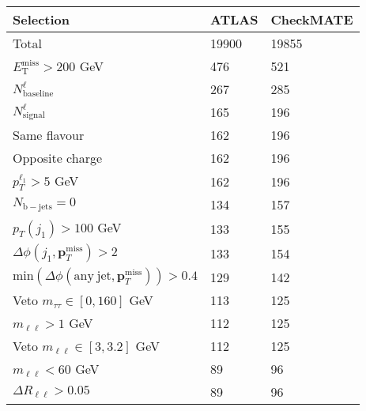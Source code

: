 \documentclass[12pt,fleqn]{article}
\begin{document}
\begin{table}[h!] 
 \renewcommand*{\arraystretch}{1.2}
 \begin{tabular}{l|p{3cm}|p{3cm}} \toprule
  Selection                                                                       & ATLAS    & CheckMATE       \\ \midrule
  Total                                                                           & 19900    & 19855           \\
  $E_\mathrm{T}^\mathrm{miss} > 200$ GeV                                          & 476      & 521   \\
  $N^\ell_\mathrm{baseline}$                                                      & 267      & 285   \\
  $N^\ell_\mathrm{signal}$                                                        & 165      & 196   \\
  Same flavour                                                                    & 162      & 196   \\
  Opposite charge                                                                 & 162      & 196   \\ 
  $p_T^{\ell_1} > 5$ GeV                                                          & 162      & 196    \\ 
  $N_\mathrm{b-jets}=0$                                                           & 134      & 157    \\
  $p_T(j_1) > 100$ GeV                                                            & 133      & 155    \\ 
  $\Delta\phi(j_1, \mathbf{p}_T^\mathrm{miss}) > 2$                               & 133      & 154   \\
  $\mathrm{min}(\Delta\phi(\mathrm{any\ jet}, \mathbf{p}_T^\mathrm{miss})) > 0.4$ & 129      & 142  \\
  Veto $m_{\tau\tau} \in [0, 160]$ GeV                                            & 113      & 125  \\
  $m_{\ell\ell}> 1$ GeV                                                           & 112      & 125  \\
  Veto $m_{\ell\ell} \in [3,3.2]$ GeV                                             & 112      & 125  \\
  $m_{\ell\ell}< 60$ GeV                                                          & 89       & 96   \\
  $\Delta R_{\ell\ell} > 0.05 $                                                   & 89       & 96   \\ \midrule

\end{tabular}
\end{table}
\end{document}

